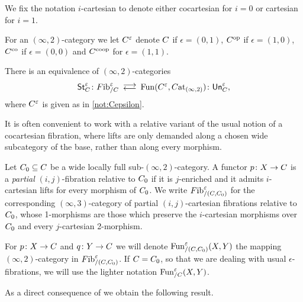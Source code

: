 \documentclass[a4paper,reqno,twoside]{amsart}
\begin{document}
\begin{notation}
	We fix the notation $i$-cartesian to denote either cocartesian for $i=0$ or cartesian for $i=1$.
\end{notation}


\begin{notation}\label{not:Cepsilon}
	For an $(\infty,2)$-category we let $\relax{C}^{\varepsilon}$ denote $\relax{C}$ if $\epsilon=(0,1)$, $\relax{C}^{\mathrm{op}}$ if $\epsilon=(1,0)$, $\relax{C}^{\mathrm{co}}$ if $\epsilon=(0,0)$ and $\relax{C}^{\mathrm{coop}}$ for $\epsilon=(1,1)$.
\end{notation}

\begin{theorem}\label{thm:str}
	There is an equivalence of $(\infty,2)$-categories
	\[
		\mathsf{St}^{\epsilon}_{\cC} \colon \Fib^{\epsilon}_{/\cC} \llra \Fun(\cC^{\epsilon},\Cat_{(\infty,2)})\colon \mathsf{Un}_{\cC}^{\epsilon},
	\]
	where $\relax{C}^{\varepsilon}$ is given as in \cref{not:Cepsilon}.
\end{theorem}



It is often convenient to work with a relative variant of the usual notion of a cocartesian fibration, where lifts are only demanded along a chosen wide subcategory of the base, rather than along every morphism.

\begin{definition}\label{def:partialcocart}
	Let $\relax{C}_0 \subseteq \relax{C}$ be a wide locally full sub-$(\infty,2)$-category. A functor $p \colon \relax{X} \to \relax{C}$ is a \emph{partial} $(i,j)$-fibration relative to $\relax{C}_0$ if it is $j$-enriched and it admits $i$-cartesian lifts for every morphism of $\relax{C}_0$. We write $\relax{F}\mathrm{ib}^{\varepsilon}_{/(\relax{C},\relax{C}_0)}$ for the corresponding $(\infty,3)$-category of partial $(i,j)$-cartesian fibrations relative to $\relax{C}_0$, whose 1-morphisms are those which preserve the $i$-cartesian morphisms over $\relax{C}_0$ and every $j$-cartesian 2-morphism.
\end{definition}

\begin{notation}\label{not:funpartial}
	For $p \colon \relax{X} \to \relax{C}$ and $q \colon \relax{Y} \to \relax{C}$ we will denote $\mathrm{Fun}^{\varepsilon}_{/(\relax{C},\relax{C}_0)}(\relax{X},\relax{Y})$ the mapping $(\infty,2)$-category in $\relax{F}\mathrm{ib}^{\varepsilon}_{/(\relax{C},\relax{C}_0)}$. If $\relax{C}=\relax{C}_0$, so that we are dealing with usual $\epsilon$-fibrations, we will use the lighter notation $\mathrm{Fun}^{\varepsilon}_{/\relax{C}}(\relax{X},\relax{Y})$.
\end{notation}

As a direct consequence of \cite[Theorem 3.4.1]{AHM26} we obtain the following result.
\end{document}
